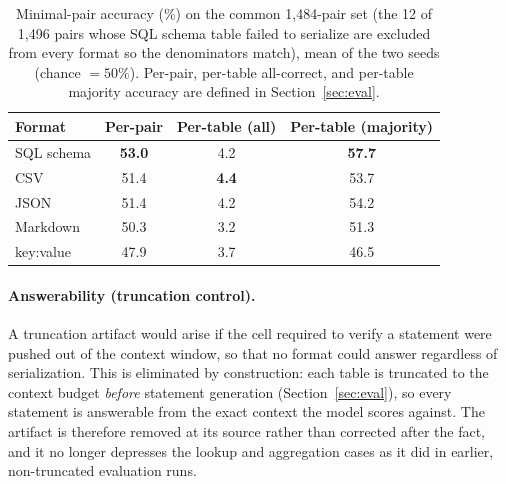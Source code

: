 \documentclass[11pt,a4paper]{article}
\begin{document}
\begin{table}[ht]
\centering
\small
\begin{tabular}{lccc}
\toprule
\textbf{Format} & \textbf{Per-pair} & \textbf{Per-table (all)} & \textbf{Per-table (majority)}\\
\midrule
SQL schema & \textbf{53.0} & 4.2 & \textbf{57.7}\\
CSV & 51.4 & \textbf{4.4} & 53.7\\
JSON & 51.4 & 4.2 & 54.2\\
Markdown & 50.3 & 3.2 & 51.3\\
key:value & 47.9 & 3.7 & 46.5\\
\bottomrule
\end{tabular}
\caption{Minimal-pair accuracy (\%) on the common 1{,}484-pair set (the 12 of 1{,}496 pairs whose SQL schema table failed to serialize are excluded from every format so the denominators match), mean of the two seeds (chance $=50\%$). Per-pair, per-table all-correct, and per-table majority accuracy are defined in Section~\ref{sec:eval}.}
\label{tab:results}
\end{table}
\paragraph{Answerability (truncation control).} A truncation artifact would arise if the cell required to verify a statement were pushed out of the context window, so that no format could answer regardless of serialization. This is eliminated by construction: each table is truncated to the context budget \emph{before} statement generation (Section~\ref{sec:eval}), so every statement is answerable from the exact context the model scores against. The artifact is therefore removed at its source rather than corrected after the fact, and it no longer depresses the lookup and aggregation cases as it did in earlier, non-truncated evaluation runs.
\end{document}
